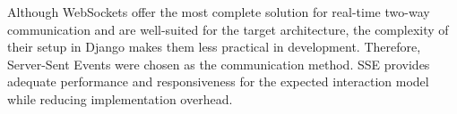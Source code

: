 Although WebSockets offer the most complete solution for real-time two-way communication and are well-suited
for the target architecture, the complexity of their setup in Django makes them less practical in development.
Therefore, Server-Sent Events were chosen as the communication method.
SSE provides adequate performance and responsiveness for the expected interaction model while reducing implementation overhead.


